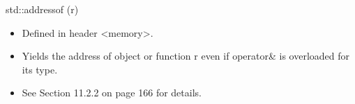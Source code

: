std::addressof (r)

\begin{itemize}
\item
Defined in header <memory>.

\item
Yields the address of object or function r even if operator\& is overloaded for its type.

\item
See Section 11.2.2 on page 166 for details.
\end{itemize}



















